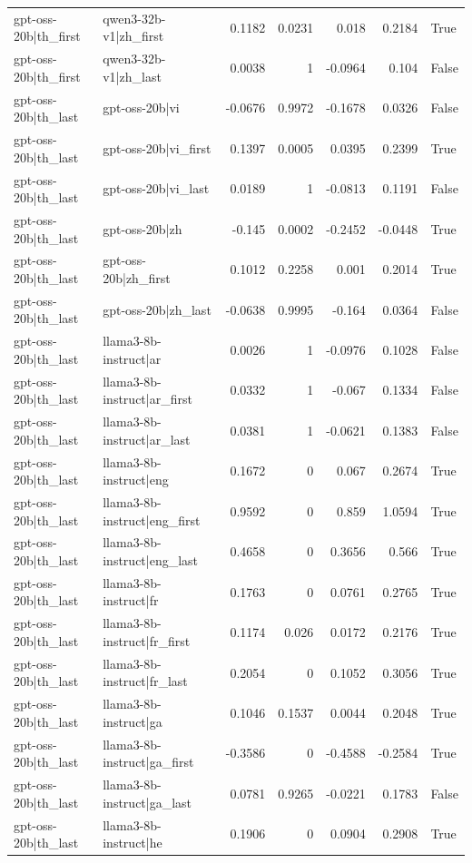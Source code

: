 \begin{table}
\begin{tabular}{l l r r r r l}
gpt-oss-20b|th_first & qwen3-32b-v1|zh_first & 0.1182 & 0.0231 & 0.018 & 0.2184 & True \\
gpt-oss-20b|th_first & qwen3-32b-v1|zh_last & 0.0038 & 1 & -0.0964 & 0.104 & False \\
gpt-oss-20b|th_last & gpt-oss-20b|vi & -0.0676 & 0.9972 & -0.1678 & 0.0326 & False \\
gpt-oss-20b|th_last & gpt-oss-20b|vi_first & 0.1397 & 0.0005 & 0.0395 & 0.2399 & True \\
gpt-oss-20b|th_last & gpt-oss-20b|vi_last & 0.0189 & 1 & -0.0813 & 0.1191 & False \\
gpt-oss-20b|th_last & gpt-oss-20b|zh & -0.145 & 0.0002 & -0.2452 & -0.0448 & True \\
gpt-oss-20b|th_last & gpt-oss-20b|zh_first & 0.1012 & 0.2258 & 0.001 & 0.2014 & True \\
gpt-oss-20b|th_last & gpt-oss-20b|zh_last & -0.0638 & 0.9995 & -0.164 & 0.0364 & False \\
gpt-oss-20b|th_last & llama3-8b-instruct|ar & 0.0026 & 1 & -0.0976 & 0.1028 & False \\
gpt-oss-20b|th_last & llama3-8b-instruct|ar_first & 0.0332 & 1 & -0.067 & 0.1334 & False \\
gpt-oss-20b|th_last & llama3-8b-instruct|ar_last & 0.0381 & 1 & -0.0621 & 0.1383 & False \\
gpt-oss-20b|th_last & llama3-8b-instruct|eng & 0.1672 & 0 & 0.067 & 0.2674 & True \\
gpt-oss-20b|th_last & llama3-8b-instruct|eng_first & 0.9592 & 0 & 0.859 & 1.0594 & True \\
gpt-oss-20b|th_last & llama3-8b-instruct|eng_last & 0.4658 & 0 & 0.3656 & 0.566 & True \\
gpt-oss-20b|th_last & llama3-8b-instruct|fr & 0.1763 & 0 & 0.0761 & 0.2765 & True \\
gpt-oss-20b|th_last & llama3-8b-instruct|fr_first & 0.1174 & 0.026 & 0.0172 & 0.2176 & True \\
gpt-oss-20b|th_last & llama3-8b-instruct|fr_last & 0.2054 & 0 & 0.1052 & 0.3056 & True \\
gpt-oss-20b|th_last & llama3-8b-instruct|ga & 0.1046 & 0.1537 & 0.0044 & 0.2048 & True \\
gpt-oss-20b|th_last & llama3-8b-instruct|ga_first & -0.3586 & 0 & -0.4588 & -0.2584 & True \\
gpt-oss-20b|th_last & llama3-8b-instruct|ga_last & 0.0781 & 0.9265 & -0.0221 & 0.1783 & False \\
gpt-oss-20b|th_last & llama3-8b-instruct|he & 0.1906 & 0 & 0.0904 & 0.2908 & True \\

\end{tabular}
\end{table}
